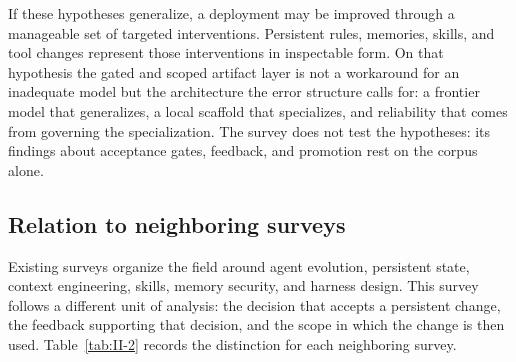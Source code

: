 \documentclass[
  11pt,
]{article}
\begin{document}
If these hypotheses generalize, a deployment may be improved through a manageable set of targeted interventions. Persistent rules, memories, skills, and tool changes represent those interventions in inspectable form. On that hypothesis the gated and scoped artifact layer is not a workaround for an inadequate model but the architecture the error structure calls for: a frontier model that generalizes, a local scaffold that specializes, and reliability that comes from governing the specialization. The survey does not test the hypotheses: its findings about acceptance gates, feedback, and promotion rest on the corpus alone.

\subsection{Relation to neighboring surveys}\label{relation-to-neighboring-surveys}

Existing surveys organize the field around agent evolution, persistent state, context engineering, skills, memory security, and harness design. This survey follows a different unit of analysis: the decision that accepts a persistent change, the feedback supporting that decision, and the scope in which the change is then used. Table~\ref{tab:II-2} records the distinction for each neighboring survey.
\end{document}
